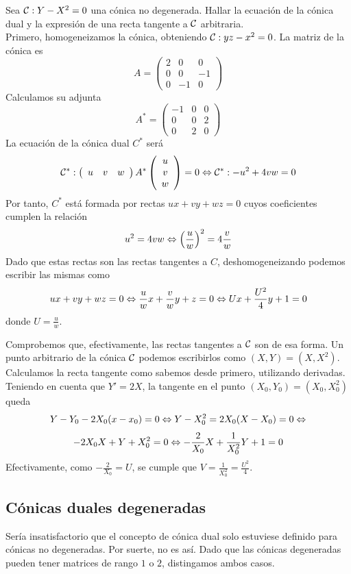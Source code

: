 \begin{exa}
	Sea $\mathcal{C}:Y-X^2=0$ una cónica no degenerada. Hallar la ecuación de la cónica dual y la expresión de una recta tangente a $\mathcal{C}$ arbitraria.\\
	
	Primero, homogeneizamos la cónica, obteniendo $\mathcal{C}:yz-x^2=0$. La matriz de la cónica es
	\[A=\left( \begin{array}{ccc}
		2&0&0\\
		0&0&-1\\
		0&-1&0
	\end{array}\right) \]
	Calculamos su adjunta
	\[A^*=\left( \begin{array}{ccc}
		 -1&0&0\\
		 0&0&2\\
		 0&2&0
	\end{array}\right) \]
	La ecuación de la cónica dual $C^*$ será 
	\[\mathcal{C}^*:\left( \begin{array}{ccc}
	u&v&w
	\end{array}\right) A^*\left( \begin{array}{c}
	u\\v\\w
	\end{array}\right) =0\Leftrightarrow\mathcal{C}^*:-u^2+4vw=0\]
	Por tanto, $C^*$ está formada por rectas $ux+vy+wz=0$ cuyos coeficientes cumplen la relación
	\[u^2=4vw\Leftrightarrow \left( \frac{u}{w}\right) ^2=4\frac{v}{w}\]
	Dado que estas rectas son las rectas tangentes a $C$, deshomogeneizando podemos escribir las mismas como
	\[ux+vy+wz=0\Leftrightarrow \frac{u}{w}x+\frac{v}{w}y+z=0\Leftrightarrow Ux+\frac{U^2}{4}y+1=0\]
	donde $U=\frac{u}{w}$. 
	
	Comprobemos que, efectivamente, las rectas tangentes a $\mathcal{C}$ son de esa forma. Un punto arbitrario de la cónica $\mathcal{C}$ podemos escribirlos como $(X,Y)=(X,X^2)$. Calculamos la recta tangente como sabemos desde primero, utilizando derivadas. Teniendo en cuenta que $Y'=2X$, la tangente en el punto $(X_0,Y_0)=(X_0,X_0^2)$ queda
	\[Y-Y_0-2X_0(x-x_0)=0\Leftrightarrow Y-X_0^2=2X_0(X-X_0)=0\Leftrightarrow\]
	\[-2X_0X+Y+X_0^2=0\Leftrightarrow -\frac{2}{X_0}X+\frac{1}{X_0^2}Y +1=0\]
	Efectivamente, como $-\frac{2}{X_0}=U$, se cumple que $V=\frac{1}{X_0^2}=\frac{U^2}{4}$.
\end{exa}
\subsection{Cónicas duales degeneradas}
Sería insatisfactorio que el concepto de cónica dual solo estuviese definido para cónicas no degeneradas. Por suerte, no es así. Dado que las cónicas degeneradas pueden tener matrices de rango $1$ o $2$, distingamos ambos casos.\\

